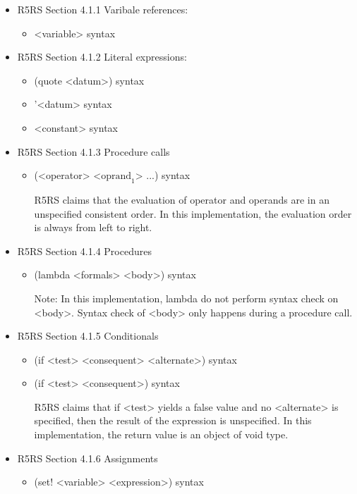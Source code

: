 \documentclass{article}
\begin{document}
\begin{itemize}

\item R5RS Section 4.1.1 Varibale references:
	\begin{itemize}
		\item <variable> \hfill syntax
	\end{itemize}		 

\item R5RS Section 4.1.2 Literal expressions:
	\begin{itemize}
		\item	(quote <datum>)	\hfill	syntax
		\item	'<datum>	\hfill	syntax
		\item	<constant>	\hfill syntax
	\end{itemize}

\item R5RS Section 4.1.3 Procedure calls
	\begin{itemize}
		\item (<operator> <$\textrm{oprand}_1$> ...)	\hfill	syntax
		
		R5RS claims that the evaluation of operator and operands are in an unspecified consistent order. In this implementation, the evaluation order is always from left to right.
	\end{itemize}

\item R5RS Section 4.1.4 Procedures
	\begin{itemize}
		\item (lambda <formals> <body>)	\hfill	syntax
		
		Note: In this implementation, lambda do not perform syntax check on <body>. Syntax check of <body> only happens during a procedure call.
	\end{itemize}
	
\item R5RS Section 4.1.5 Conditionals
	\begin{itemize}
		\item (if <test> <consequent> <alternate>)	\hfill	syntax
		\item (if <test> <consequent>)	\hfill	syntax
		
		R5RS claims that if <test> yields a false value and no <alternate> is specified, then the result of the expression is unspecified. In this implementation, the return value is an object of void type.
	\end{itemize}
	
\item R5RS Section 4.1.6 Assignments
	\begin{itemize}
		\item (set! <variable> <expression>)	\hfill	syntax		
		

\end{itemize}
\end{itemize}
\end{document}
